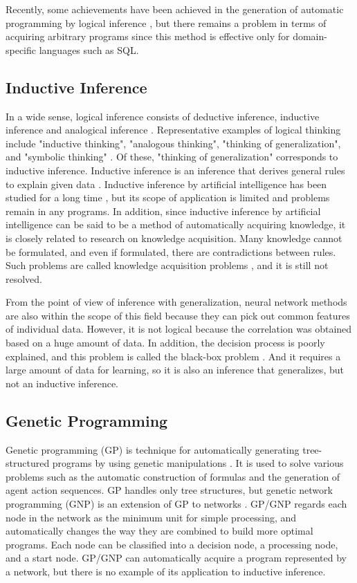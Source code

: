 \documentclass{article}
\begin{document}
Recently, some achievements have been achieved in the generation of automatic programming by logical inference \cite{palsql}, but there remains a problem in terms of acquiring arbitrary programs since this method is effective only for domain-specific languages such as SQL.

\subsection {Inductive Inference}
In a wide sense, logical inference consists of deductive inference, inductive inference and analogical inference \cite{math300}.
Representative examples of logical thinking include "inductive thinking", "analogous thinking", "thinking of generalization", and "symbolic thinking" \cite{saito:11}.
Of these, "thinking of generalization" corresponds to inductive inference.
Inductive inference is an inference that derives general rules to explain given data \cite {inductive-reasoning}.
Inductive inference by artificial intelligence has been studied for a long time \cite{CASE1983193}\cite{4767034}, but its scope of application is limited and problems remain in any programs.
In addition, since inductive inference by artificial intelligence can be said to be a method of automatically acquiring knowledge, it is closely related to research on knowledge acquisition.
Many knowledge cannot be formulated, and even if formulated, there are contradictions between rules. Such problems are called knowledge acquisition problems \cite{KnowledgeAI}\cite{KAIssues}, and it is still not resolved.

From the point of view of inference with generalization, neural network methods are also within the scope of this field because they can pick out common features of individual data.
However, it is not logical because the correlation was obtained based on a huge amount of data.
In addition, the decision process is poorly explained, and this problem is called the black-box problem \cite{BlackBoxProblem}.
And it requires a large amount of data for learning, so it is also an inference that generalizes, but not an inductive inference.

\subsection {Genetic Programming}
Genetic programming (GP) is technique for automatically generating tree-structured programs by using genetic manipulations \cite{Koza1994}.
It is used to solve various problems such as the automatic construction of formulas and the generation of agent action sequences.
GP handles only tree structures, but genetic network programming (GNP) is an extension of GP to networks \cite{gnp}.
GP/GNP regards each node in the network as the minimum unit for simple processing, and automatically changes the way they are combined to build more optimal programs.
Each node can be classified into a decision node, a processing node, and a start node.
GP/GNP can automatically acquire a program represented by a network, but there is no example of its application to inductive inference.
\end{document}
